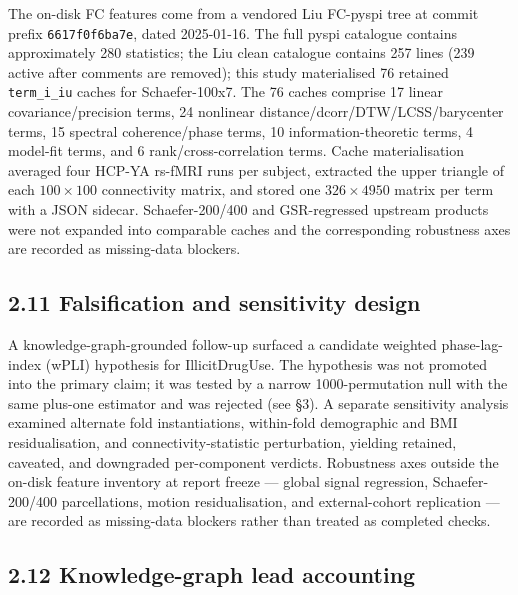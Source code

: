 \documentclass[11pt,letterpaper]{report}
\begin{document}
The on-disk FC features come from a vendored Liu FC-pyspi tree at commit prefix \texttt{6617f0f6ba7e}, dated 2025-01-16. The full pyspi catalogue contains approximately 280 statistics; the Liu clean catalogue contains 257 lines (239 active after comments are removed); this study materialised 76 retained \texttt{term\_i\_iu} caches for Schaefer-100x7. The 76 caches comprise 17 linear covariance/precision terms, 24 nonlinear distance/dcorr/DTW/LCSS/barycenter terms, 15 spectral coherence/phase terms, 10 information-theoretic terms, 4 model-fit terms, and 6 rank/cross-correlation terms. Cache materialisation averaged four HCP-YA rs-fMRI runs per subject, extracted the upper triangle of each $100 \times 100$ connectivity matrix, and stored one $326 \times 4950$ matrix per term with a JSON sidecar. Schaefer-200/400 and GSR-regressed upstream products were not expanded into comparable caches and the corresponding robustness axes are recorded as missing-data blockers.

\subsection*{2.11 Falsification and sensitivity design}

A knowledge-graph-grounded follow-up surfaced a candidate weighted phase-lag-index (wPLI) hypothesis for IllicitDrugUse. The hypothesis was not promoted into the primary claim; it was tested by a narrow 1000-permutation null with the same plus-one estimator and was rejected (see \S3). A separate sensitivity analysis examined alternate fold instantiations, within-fold demographic and BMI residualisation, and connectivity-statistic perturbation, yielding retained, caveated, and downgraded per-component verdicts. Robustness axes outside the on-disk feature inventory at report freeze --- global signal regression, Schaefer-200/400 parcellations, motion residualisation, and external-cohort replication --- are recorded as missing-data blockers rather than treated as completed checks.

\subsection*{2.12 Knowledge-graph lead accounting}
\end{document}
